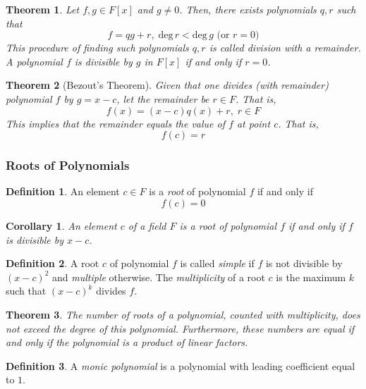 \documentclass{article}
\newtheorem{theorem}{Theorem}[section]
\newtheorem{corollary}{Corollary}[theorem]
\theoremstyle{remark}
\theoremstyle{definition}
\newtheorem{definition}{Definition}[section]
\begin{document}
\begin{theorem}
Let $f, g \in F[x]$ and $g \neq 0$. Then, there exists polynomials $q, r$ such that 
\[ f = q g + r, \; \text{deg}\, r < \text{deg}\, g \text{ (or } r = 0 \text{)}\]
This procedure of finding such polynomials $q, r$ is called \textit{division with a remainder}. A polynomial $f$ is divisible by $g$ in $F[x]$ if and only if $r = 0$. 
\end{theorem}

\begin{theorem}[Bezout's Theorem]
Given that one divides (with remainder) polynomial $f$ by $g = x - c$, let the remainder be $r \in F$. That is, 
\[f(x) = (x-c) q(x) + r, \; r \in F\]
This implies that the remainder equals the value of $f$ at point $c$. That is, 
\[f(c) = r\]
\end{theorem}

\subsubsection{Roots of Polynomials}
\begin{definition}
An element $c \in F$ is a \textit{root} of polynomial $f$ if and only if 
\[ f(c) = 0\]
\end{definition}

\begin{corollary}
An element $c$ of a field $F$ is a root of polynomial $f$ if and only if $f$ is divisible by $x - c$. 
\end{corollary}

\begin{definition}
A root $c$ of polynomial $f$ is called \textit{simple} if $f$ is not divisible by $(x-c)^2$ and \textit{multiple} otherwise. The \textit{multiplicity} of a root $c$ is the maximum $k$ such that $(x-c)^k$ divides $f$. 
\end{definition}

\begin{theorem}
The number of roots of a polynomial, counted with multiplicity, does not exceed the degree of this polynomial. Furthermore, these numbers are equal if and only if the polynomial is a product of linear factors.
\end{theorem}

\begin{definition}
A \textit{monic polynomial} is a polynomial with leading coefficient equal to $1$. 
\end{definition}
\end{document}
